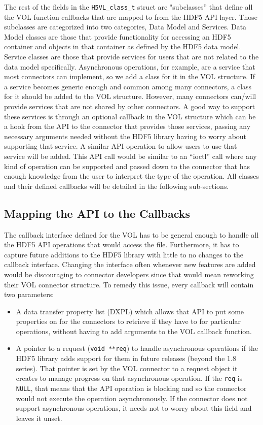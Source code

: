 The rest of the fields in the \texttt{H5VL\_class\_t} struct are "subclasses'' that define all the VOL function callbacks that
are mapped to from the HDF5 API layer. Those subclasses are categorized into two categories, Data Model and Services. Data Model classes are those that provide functionality for accessing an HDF5 container and objects in that container as defined by the HDF5 data model.  Service classes are those that provide services for users that are not related to the data model specifically. Asynchronous operations, for example, are a service that most connectors can implement, so we add a class for it in the VOL structure. If a service becomes generic enough and common among many connectors, a class for it should be added to the VOL structure. However, many connectors can/will provide services that are not shared by other connectors. A good way to support these services is through an optional callback in the VOL structure which can be a hook from the API to the connector that provides those services, passing any necessary arguments needed without the HDF5 library having to worry about supporting that service. A similar API operation to allow users to use that service will be added. This API call would be similar to an “ioctl” call where any kind of operation can be supported and passed down to the connector that has enough knowledge from the user to interpret the type of the operation. All classes and their defined callbacks will be detailed in the following sub-sections.

\subsection{Mapping the API to the Callbacks}
\label{sec:map}

The callback interface defined for the VOL has to be general enough to
handle all the HDF5 API operations that would access the
file. Furthermore, it has to capture future additions to the HDF5
library with little to no changes to the callback interface. Changing
the interface often whenever new features are added would be
discouraging to connector developers since that would mean reworking
their VOL connector structure. To remedy this issue, every callback will
contain two parameters:
\begin{itemize}
\item A data transfer property list (DXPL) which allows that API to
  put some properties on for the connectors to retrieve if they have to
  for particular operations, without having to add arguments to the
  VOL callback function.
\item A pointer to a request (\texttt{void **req}) to handle asynchronous
  operations if the HDF5 library adds support for them in future
  releases (beyond the 1.8 series). That pointer is set by the VOL
  connector to a request object it creates to manage progress on that
  asynchronous operation. If the \texttt{req} is \texttt{NULL}, that means
  that the API operation is blocking and so the connector would not
  execute the operation asynchronously. If the connector does not support
  asynchronous operations, it needs not to worry about this field and
  leaves it unset.
\end{itemize}


